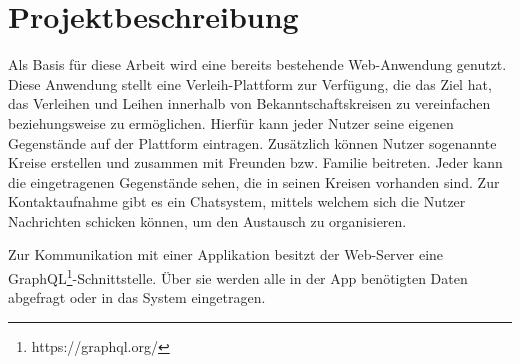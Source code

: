 \section{Projektbeschreibung}
Als Basis für diese Arbeit wird eine bereits bestehende Web-Anwendung genutzt. Diese Anwendung stellt eine Verleih-Plattform zur Verfügung, die das Ziel hat, das Verleihen und Leihen innerhalb von Bekanntschaftskreisen zu vereinfachen beziehungsweise zu ermöglichen. Hierfür kann jeder Nutzer seine eigenen Gegenstände auf der Plattform eintragen. Zusätzlich können Nutzer sogenannte Kreise erstellen und zusammen mit Freunden bzw. Familie beitreten. Jeder kann die eingetragenen Gegenstände sehen, die in seinen Kreisen vorhanden sind. Zur Kontaktaufnahme gibt es ein Chatsystem, mittels welchem sich die Nutzer Nachrichten schicken können, um den Austausch zu organisieren. 

Zur Kommunikation mit einer Applikation besitzt der Web-Server eine GraphQL\footnote{https://graphql.org/}-Schnittstelle. Über sie werden alle in der App benötigten Daten abgefragt oder in das System eingetragen.
